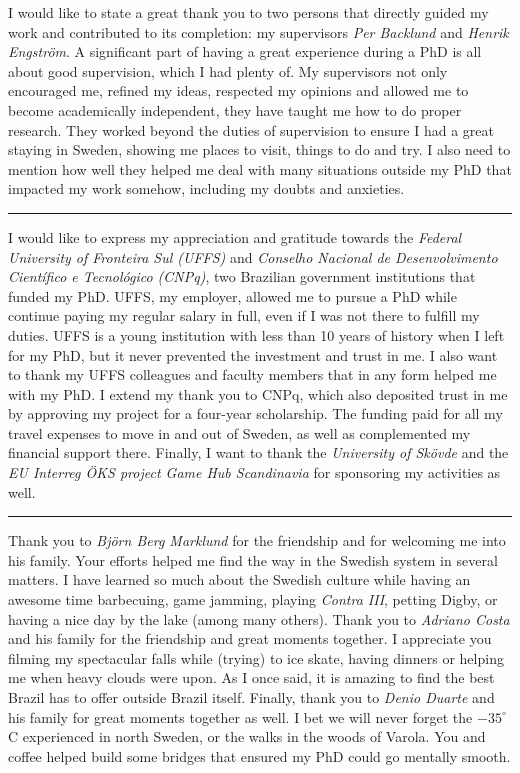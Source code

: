 I would like to state a great thank you to two persons that directly guided my work and contributed to its completion: my supervisors \textit{Per Backlund} and \textit{Henrik Engstr{\"o}m}. A significant part of having a great experience during a PhD is all about good supervision, which I had plenty of. My supervisors not only encouraged me, refined my ideas, respected my opinions and allowed me to become academically independent, they have taught me how to do proper research. They worked beyond the duties of supervision to ensure I had a great staying in Sweden, showing me places to visit, things to do and try. I also need to mention how well they helped me deal with many situations outside my PhD that impacted my work somehow, including my doubts and anxieties.

\vspace{7pt}\hrule\vspace{5pt}

I would like to express my appreciation and gratitude towards the \textit{Federal University of Fronteira Sul (UFFS)} and \textit{Conselho Nacional de Desenvolvimento Cient\'{i}fico e Tecnol\'{o}gico (CNPq)}, two Brazilian government institutions that funded my PhD. UFFS, my employer, allowed me to pursue a PhD while continue paying my regular salary in full, even if I was not there to fulfill my duties. UFFS is a young institution with less than 10 years of history when I left for my PhD, but it never prevented the investment and trust in me. I also want to thank my UFFS colleagues and faculty members that in any form helped me with my PhD. I extend my thank you to CNPq, which also deposited trust in me by approving my project for a four-year scholarship. The funding paid for all my travel expenses to move in and out of Sweden, as well as complemented my financial support there. Finally, I want to thank the \textit{University of Sk\"ovde} and the \textit{EU Interreg \"OKS project Game Hub Scandinavia} for sponsoring my activities as well.

\vspace{7pt}\hrule\vspace{5pt}

Thank you to \textit{Bj{\"o}rn Berg Marklund} for the friendship and for welcoming me into his family. Your efforts helped me find the way in the Swedish system in several matters. I have learned so much about the Swedish culture while having an awesome time barbecuing, game jamming, playing \textit{Contra III}, petting Digby, or having a nice day by the lake (among many others). Thank you to \textit{Adriano Costa} and his family for the friendship and great moments together. I appreciate you filming my spectacular falls while (trying) to ice skate, having dinners or helping me when heavy clouds were upon. As I once said, it is amazing to find the best Brazil has to offer outside Brazil itself. Finally, thank you to \textit{Denio Duarte} and his family for great moments together as well. I bet we will never forget the $-35^{\circ}$C experienced in north Sweden, or the walks in the woods of Varola. You and coffee helped build some bridges that ensured my PhD could go mentally smooth.

